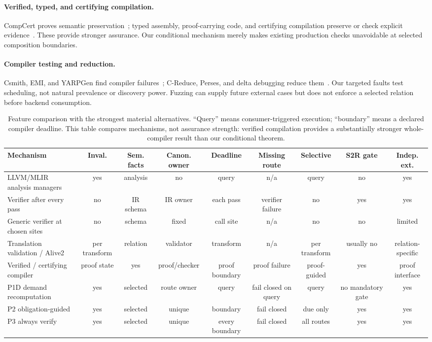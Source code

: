 \paragraph{Verified, typed, and certifying compilation.}
CompCert proves semantic preservation~\cite{leroy06,leroy09backend}; typed assembly, proof-carrying code, and certifying compilation preserve or check explicit evidence~\cite{tal,pcc,certcompiler}. These provide stronger assurance. Our conditional mechanism merely makes existing production checks unavoidable at selected composition boundaries.

\paragraph{Compiler testing and reduction.}
Csmith, EMI, and YARPGen find compiler failures~\cite{csmith,emi,yarpgen}; C-Reduce, Perses, and delta debugging reduce them~\cite{creduce,perses,delta}. Our targeted faults test scheduling, not natural prevalence or discovery power. Fuzzing can supply future external cases but does not enforce a selected relation before backend consumption.

\begin{table}[t]
\caption{Feature comparison with the strongest material alternatives. ``Query'' means consumer-triggered execution; ``boundary'' means a declared compiler deadline. This table compares mechanisms, not assurance strength: verified compilation provides a substantially stronger whole-compiler result than our conditional theorem.}
\label{tab:related-comparison}
\scriptsize
\centering
\setlength{\tabcolsep}{2.5pt}
\begin{tabular}{@{}p{}cccccccc@{}}
\toprule
Mechanism & Inval. & Sem. facts & Canon. owner & Deadline & Missing route & Selective & S2R gate & Indep. ext. \\
\midrule
LLVM/MLIR analysis managers & yes & analysis & no & query & n/a & query & no & yes \\
Verifier after every pass & no & IR schema & IR owner & each pass & verifier failure & no & yes & yes \\
Generic verifier at chosen sites & no & schema & fixed & call site & n/a & no & no & limited \\
Translation validation / Alive2 & per transform & relation & validator & transform & n/a & per transform & usually no & relation-specific \\
Verified / certifying compiler & proof state & yes & proof/checker & proof boundary & proof failure & proof-guided & yes & proof interface \\
P1D demand recomputation & yes & selected & route owner & query & fail closed on query & query & no mandatory gate & yes \\
P2 obligation-guided & yes & selected & unique & boundary & fail closed & due only & yes & yes \\
P3 always verify & yes & selected & unique & every boundary & fail closed & all routes & yes & yes \\
\bottomrule
\end{tabular}
\end{table}

